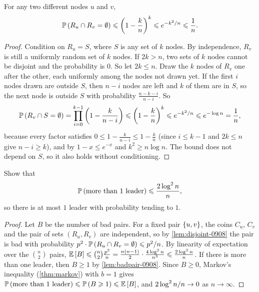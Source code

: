 \begin{claim}\label{lem:disjoint-0908}
    For any two different nodes $u$ and $v$,
    \[\prob{R_u \cap R_v = \emptyset} \leq \left(1 - \frac{k}{n}\right)^{k}
        \leq e^{-\sfrac{k^2}{n}} \leq \frac{1}{n}.\]
\end{claim}

\begin{proof}
    Condition on $R_u = S$, where $S$ is any set of $k$ nodes. By independence, $R_v$ is still a
    uniformly random set of $k$ nodes. If $2k > n$, two sets of $k$ nodes cannot be disjoint and the
    probability is $0$. So let $2k \leq n$. Draw the $k$ nodes of $R_v$ one after the other, each
    uniformly among the nodes not drawn yet. If the first $i$ nodes drawn are outside $S$, then
    $n - i$ nodes are left and $k$ of them are in $S$, so the next node is outside $S$ with
    probability $\frac{n - k - i}{n - i}$. So
    \[\prob{R_v \cap S = \emptyset}
        = \prod_{i=0}^{k-1} \left(1 - \frac{k}{n - i}\right)
        \leq \left(1 - \frac{k}{n}\right)^{k}
        \leq e^{-\sfrac{k^2}{n}} \leq e^{-\log n} = \frac{1}{n},\]
    because every factor satisfies $0 \leq 1 - \frac{k}{n-i} \leq 1 - \frac{k}{n}$ (since $i \leq k - 1$
    and $2k \leq n$ give $n - i \geq k$), and by $1 - x \leq e^{-x}$ and $k^2 \geq n \log n$. The
    bound does not depend on $S$, so it also holds without conditioning.
\end{proof}

\begin{exercisebox}
\begin{exercise}\label{ex:atmost-0908}\label{thm:leader-atmost-0908}
    Show that
    \[\prob{\text{more than $1$ leader}} \leq \frac{2 \log^2 n}{n},\]
    so there is at most $1$ leader with probability tending to $1$.
\end{exercise}
\tcblower
\begin{proof}
    Let $B$ be the number of bad pairs. For a fixed pair $\left\lbrace u,v\right\rbrace$, the coins $C_u$, $C_v$ and the
    pair of sets $(R_u, R_v)$ are independent, so by \cref{lem:disjoint-0908} the pair is bad with
    probability $p^2 \cdot \prob{R_u \cap R_v = \emptyset} \leq \sfrac{p^2}{n}$. By linearity of
    expectation over the $\binom{n}{2}$ pairs,
    $\expectation{B} \leq \binom{n}{2} \frac{p^2}{n} = \frac{n(n-1)}{2} \cdot \frac{4 \log^2 n}{n^3}
        \leq \frac{2 \log^2 n}{n}$.
    If there is more than one leader, then $B \geq 1$ by \cref{lem:badpair-0908}. Since $B \geq 0$,
    Markov's inequality (\cref{thm:markov}) with $b = 1$ gives
    $\prob{\text{more than $1$ leader}} \leq \prob{B \geq 1} \leq \expectation{B}$, and
    $2 \log^2 n/n \to 0$ as $n \to \infty$.
\end{proof}
\end{exercisebox}

